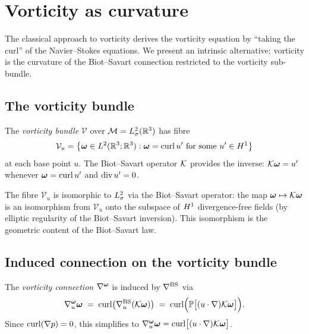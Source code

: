 \section{Vorticity as curvature}\label{sec:bs-vorticity}

The classical approach to vorticity derives the vorticity equation by ``taking the curl''
of the Navier--Stokes equations.  We present an intrinsic alternative: vorticity is the
curvature of the Biot--Savart connection restricted to the vorticity sub-bundle.

\subsection{The vorticity bundle}

\begin{definition}\label{def:vorticity-bundle}
  The \emph{vorticity bundle} $\mathcal{V}$ over $\mathcal{M} = L^{2}_\sigma(\mathbb{R}^3)$ has fibre
  \begin{equation}\label{eq:vorticity-fibre}
    \mathcal{V}_u = \bigl\{\boldsymbol{\omega} \in L^{2}(\mathbb{R}^3;\mathbb{R}^3) :
    \boldsymbol{\omega} = \operatorname{curl} u' \text{ for some } u' \in H^{1}\bigr\}
  \end{equation}
  at each base point $u$.  The Biot--Savart operator $\mathcal{K}$ provides the inverse:
  $\mathcal{K}\boldsymbol{\omega} = u'$ whenever $\boldsymbol{\omega} = \operatorname{curl} u'$ and $\operatorname{div} u' = 0$.
\end{definition}

\begin{remark}
  The fibre $\mathcal{V}_u$ is isomorphic to $L^{2}_\sigma$ via the Biot--Savart operator: the
  map $\boldsymbol{\omega} \mapsto \mathcal{K}\boldsymbol{\omega}$ is an isomorphism from $\mathcal{V}_u$ onto the
  subspace of $H^{1}$ divergence-free fields (by elliptic regularity of the
  Biot--Savart inversion).  This isomorphism is the geometric content of the
  Biot--Savart law.
\end{remark}

\subsection{Induced connection on the vorticity bundle}

\begin{definition}\label{def:vort-conn}
  The \emph{vorticity connection} $\nabla^{\boldsymbol{\omega}}$ is induced by $\nabla^{\mathrm{BS}}$ via
  \begin{equation}\label{eq:vort-conn}
    \nabla^{\boldsymbol{\omega}}_u \boldsymbol{\omega}
    \;=\; \operatorname{curl}\bigl(\nabla^{\mathrm{BS}}_u (\mathcal{K}\boldsymbol{\omega})\bigr)
    \;=\; \operatorname{curl}\Bigl(\mathbb{P}\bigl[(u \cdot \nabla)\mathcal{K}\boldsymbol{\omega}\bigr]\Bigr).
  \end{equation}
  Since $\operatorname{curl}(\nabla p) = 0$, this simplifies to
  $\nabla^{\boldsymbol{\omega}}_u \boldsymbol{\omega} = \operatorname{curl}\bigl[(u \cdot \nabla)\mathcal{K}\boldsymbol{\omega}\bigr]$.
\end{definition}

